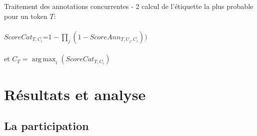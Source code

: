 \documentclass[french]{beamer}
\begin{document}
\begin{frame}{Traitement des annotations concurrentes - 2}
  \centering
  \small calcul de l'étiquette la plus probable pour un token $T$: \\~\\
  \small $ScoreCat_{T,C_i}$=$1 - \prod_{j} (1-ScoreAnn_{T,U_j,C_i}))$ \\~\\
  \small et $C_{T}=\operatorname*{arg\,max}_i(ScoreCat_{T,C_i})$                
  \begin{table}[!ht]
    \centering
  \end{table}
  \centering
\end{frame}

\section{Résultats et analyse}

\subsection{La participation}
\end{document}
